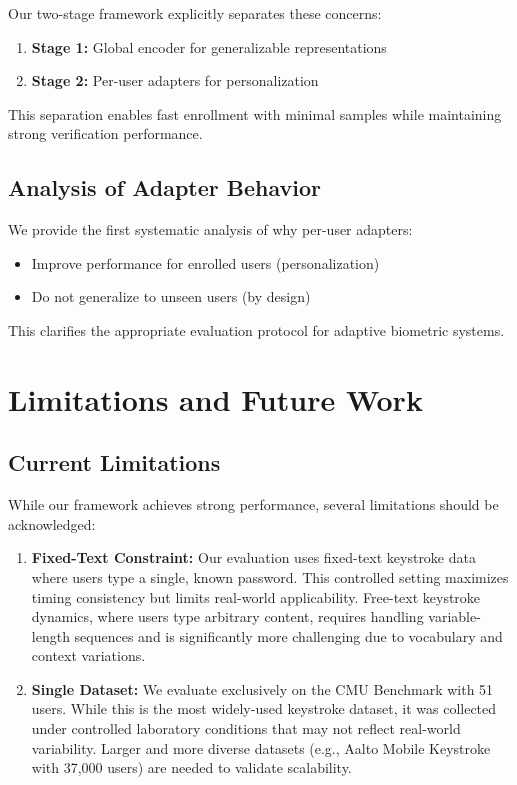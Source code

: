 \documentclass{ieeeaccess}
\begin{document}
{Our two-stage framework explicitly separates these concerns:
\begin{enumerate}
\item \textbf{Stage 1:} Global encoder for generalizable representations
\item \textbf{Stage 2:} Per-user adapters for personalization
\end{enumerate}

This separation enables fast enrollment with minimal samples while maintaining strong verification performance.

\subsection{Analysis of Adapter Behavior}

We provide the first systematic analysis of why per-user adapters:
\begin{itemize}
\item Improve performance for enrolled users (personalization)
\item Do not generalize to unseen users (by design)
\end{itemize}

This clarifies the appropriate evaluation protocol for adaptive biometric systems.

\section{Limitations and Future Work}
\label{sec:limitations}

\subsection{Current Limitations}

While our framework achieves strong performance, several limitations should be acknowledged:

\begin{enumerate}
\item \textbf{Fixed-Text Constraint:} Our evaluation uses fixed-text keystroke data where users type a single, known password. This controlled setting maximizes timing consistency but limits real-world applicability. Free-text keystroke dynamics, where users type arbitrary content, requires handling variable-length sequences and is significantly more challenging due to vocabulary and context variations.

\item \textbf{Single Dataset:} We evaluate exclusively on the CMU Benchmark with 51 users. While this is the most widely-used keystroke dataset, it was collected under controlled laboratory conditions that may not reflect real-world variability. Larger and more diverse datasets (e.g., Aalto Mobile Keystroke~\cite{b32} with 37,000 users) are needed to validate scalability.


\end{enumerate}}
\end{document}
